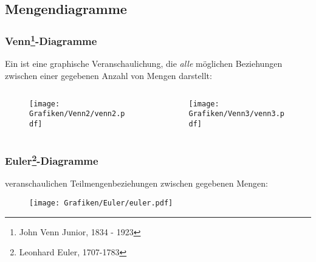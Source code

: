 \subsection{Mengendiagramme}
%
\begin{frame}\frametitle{Venn\footnote{John Venn Junior, 1834 - 1923}-Diagramme}
	
	Ein  ist eine graphische Veranschaulichung, 
	die \textit{alle} möglichen Beziehungen zwischen einer gegebenen Anzahl von Mengen darstellt:
	
	\begin{columns}
		\begin{column}{0.5\textwidth}
			\begin{figure}
				\texttt{[image: Grafiken/Venn2/venn2.pdf]}
			\end{figure}
		\end{column}
		\begin{column}{0.5\textwidth}
			\begin{figure}
				\texttt{[image: Grafiken/Venn3/venn3.pdf]}
			\end{figure}
		\end{column}
	\end{columns}
	
\end{frame}
%
%
\begin{frame}\frametitle{Euler\footnote{Leonhard Euler, 1707-1783}-Diagramme}
	
	 veranschaulichen Teilmengenbeziehungen zwischen gegebenen Mengen:\\[3mm]
	
	\begin{figure}
		\texttt{[image: Grafiken/Euler/euler.pdf]}
	\end{figure}
	
\end{frame}
%
%
